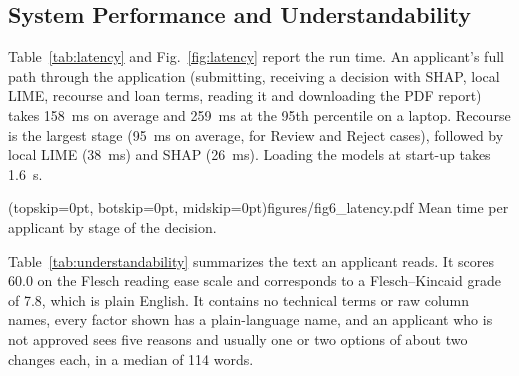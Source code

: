 

\subsection{System Performance and Understandability}
Table~\ref{tab:latency} and Fig.~\ref{fig:latency} report the run time. An applicant's full path through the
application (submitting, receiving a decision with SHAP, local LIME, recourse and loan terms, reading it and
downloading the PDF report) takes 158~ms on average and 259~ms at the 95th percentile on a laptop. Recourse is the
largest stage (95~ms on average, for Review and Reject cases), followed by local LIME (38~ms) and SHAP (26~ms). Loading
the models at start-up takes 1.6~s.



\Figure[t!](topskip=0pt, botskip=0pt, midskip=0pt){figures/fig6_latency.pdf}
{Mean time per applicant by stage of the decision.\label{fig:latency}}

Table~\ref{tab:understandability} summarizes the text an applicant reads. It scores 60.0 on the Flesch reading ease
scale and corresponds to a Flesch--Kincaid grade of 7.8, which is plain English. It contains no technical terms or raw
column names, every factor shown has a plain-language name, and an applicant who is not approved sees five reasons and
usually one or two options of about two changes each, in a median of 114 words.


